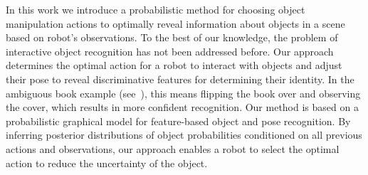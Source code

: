 In this work we introduce a probabilistic method for choosing object manipulation actions to optimally reveal information about objects in a scene based on robot's observations.
To the best of our knowledge, the problem of interactive object recognition has not been addressed before. 
Our approach determines the optimal action for a robot to interact with objects and adjust their pose to reveal discriminative features for determining their identity.
In the ambiguous book example (see~), this means flipping the book over and observing the cover, which results in more confident recognition.
Our method is based on a probabilistic graphical model for feature-based object and pose recognition.
By inferring posterior distributions of object probabilities conditioned on all previous actions and observations, our approach enables a robot to select the optimal action to reduce the uncertainty of the object.



